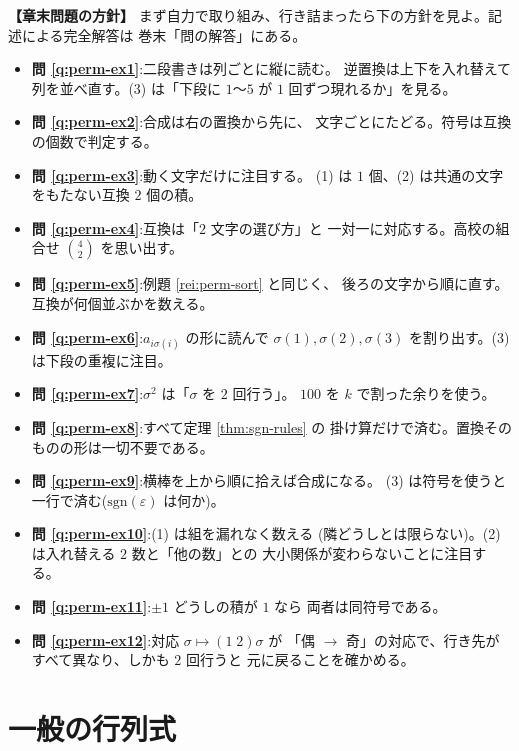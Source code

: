 \bigskip
{\small
\noindent\textbf{【章末問題の方針】}\quad
まず自力で取り組み、行き詰まったら下の方針を見よ。記述による完全解答は
巻末「問の解答」にある。
\begin{itemize}
\item \textbf{問 \ref{q:perm-ex1}}:二段書きは列ごとに縦に読む。
逆置換は上下を入れ替えて列を並べ直す。(3) は「下段に $1$〜$5$ が
$1$ 回ずつ現れるか」を見る。
\item \textbf{問 \ref{q:perm-ex2}}:合成は右の置換から先に、
文字ごとにたどる。符号は互換の個数で判定する。
\item \textbf{問 \ref{q:perm-ex3}}:動く文字だけに注目する。
(1) は $1$ 個、(2) は共通の文字をもたない互換 $2$ 個の積。
\item \textbf{問 \ref{q:perm-ex4}}:互換は「$2$ 文字の選び方」と
一対一に対応する。高校の組合せ $\binom{4}{2}$ を思い出す。
\item \textbf{問 \ref{q:perm-ex5}}:例題 \ref{rei:perm-sort} と同じく、
後ろの文字から順に直す。互換が何個並ぶかを数える。
\item \textbf{問 \ref{q:perm-ex6}}:$a_{i\sigma(i)}$ の形に読んで
$\sigma(1), \sigma(2), \sigma(3)$ を割り出す。(3) は下段の重複に注目。
\item \textbf{問 \ref{q:perm-ex7}}:$\sigma^2$ は「$\sigma$ を $2$ 回行う」。
$100$ を $k$ で割った余りを使う。
\item \textbf{問 \ref{q:perm-ex8}}:すべて定理 \ref{thm:sgn-rules} の
掛け算だけで済む。置換そのものの形は一切不要である。
\item \textbf{問 \ref{q:perm-ex9}}:横棒を上から順に拾えば合成になる。
(3) は符号を使うと一行で済む($\mathrm{sgn}(\varepsilon)$ は何か)。
\item \textbf{問 \ref{q:perm-ex10}}:(1) は組を漏れなく数える
(隣どうしとは限らない)。(2) は入れ替える $2$ 数と「他の数」との
大小関係が変わらないことに注目する。
\item \textbf{問 \ref{q:perm-ex11}}:$\pm 1$ どうしの積が $1$ なら
両者は同符号である。
\item \textbf{問 \ref{q:perm-ex12}}:対応 $\sigma \mapsto (1\;2)\sigma$ が
「偶 $\to$ 奇」の対応で、行き先がすべて異なり、しかも $2$ 回行うと
元に戻ることを確かめる。
\end{itemize}
}

\chapter{一般の行列式}\label{chap:gendet}

